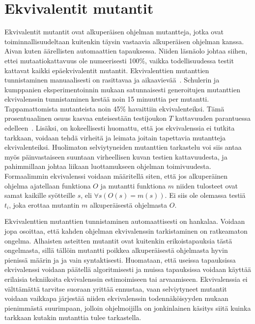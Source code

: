 \documentclass{tktltiki}
\begin{document}
\section{Ekvivalentit mutantit}
Ekvivalentit mutantit ovat alkuperäisen ohjelman mutantteja, jotka ovat toiminnallisuudeltaan kuitenkin täysin vastaavia alkuperäisen ohjelman kanssa. Aivan kuten äärellisten automaattien tapauksessa. Niiden läsnäolo johtaa siihen, ettei mutaatiokattavuus ole numeerisesti 100\%, vaikka todellisuudessa testit kattavat kaikki epäekvivalentit mutantit. Ekvivalenttien mutanttien tunnistaminen manuaalisesti on rasittavaa ja aikaavievää~\cite{GrunSZ09}. Schulerin ja kumppanien eksperimentoinnin mukaan satunnaisesti generoitujen mutanttien ekvivalenssin tunnistaminen kestää noin 15 minuuttia per mutantti. Tappamattomista mutanteista noin 45\% havaittiin ekvivalenteiksi. Tämä prosentuaalinen osuus kasvaa enteisestään testijoukon $T$ kattavuuden parantuessa edelleen~\cite{SchulerZ10}. Lisäksi, on kokeellisesti huomattu, että jos ekvivalenssia ei tutkita tarkkaan, voidaan tehdä virheitä ja leimata joitain tapettavia mutantteja ekvivalenteiksi. Huolimaton selviytyneiden mutanttien tarkastelu voi siis antaa myös päinvastaiseen suuntaan virheellisen kuvan testien kattavuudesta, ja pahimmillaan johtaa liikaan luottamukseen ohjelman toimivuudesta. Formaalimmin ekvivalenssi voidaan määritellä siten, että jos alkuperäinen ohjelma ajatellaan funktiona $O$ ja mutantti funktiona $m$ niiden tulosteet ovat samat kaikille syötteille $s$, eli $\forall s(O(s) = m(s))$. Ei siis ole olemassa testiä $t_i$, joka erottaa mutantin $m$ alkuperäisestä ohjelmasta $O$. 

Ekvivalenttien mutanttien tunnistaminen automaattisesti on hankalaa. Voidaan jopa osoittaa, että kahden ohjelman ekvivalenssin tarkistaminen on ratkeamaton ongelma. Alhaisten asteitten mutantit ovat kuitenkin erikoistapauksia tästä ongelmasta, sillä tällöin mutantti poikkea alkuperäisestä ohjelmasta hyvin pienissä määrin ja ja vain syntaktisesti. Huomataan, että useissa tapauksissa ekvivalenssi voidaan päätellä algoritmisesti ja muissa tapauksissa voidaan käyttää erilaisia tekniikoita ekvivalenssin estimoimiseen tai arvaamiseen. Ekvivalenssia ei välttämättä tarvitse suoraan yrittää ennustaa, vaan selviytyneet mutantit voidaan vaikkapa järjestää niiden ekvivalenssin todennäköisyyden mukaan pienimmästä suurimpaan, jolloin ohjelmoijilla on jonkinlainen käsitys siitä kuinka tarkkaan kutakin mutanttia tulee tarkastella.
\end{document}
